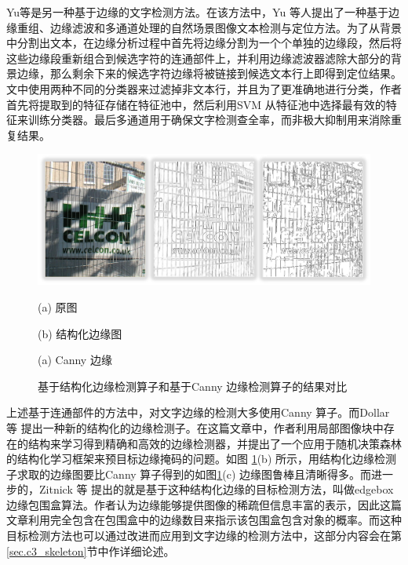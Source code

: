     Yu等\cite{Yu2016Scene}是另一种基于边缘的文字检测方法。在该方法中，Yu 等人提出了一种基于边缘重组、边缘滤波和多通道处理的自然场景图像文本检测与定位方法。为了从背景中分割出文本，在边缘分析过程中首先将边缘分割为一个个单独的边缘段，然后将这些边缘段重新组合到候选字符的连通部件上，并利用边缘滤波器滤除大部分的背景边缘，那么剩余下来的候选字符边缘将被链接到候选文本行上即得到定位结果。文中使用两种不同的分类器来过滤掉非文本行，并且为了更准确地进行分类，作者首先将提取到的特征存储在特征池中，然后利用SVM 从特征池中选择最有效的特征来训练分类器。最后多通道用于确保文字检测查全率，而非极大抑制用来消除重复结果。

    \begin{figure}[!h]
    \centering
    \includegraphics[width=\textwidth]{./figures/c2_sf_vs_canny.jpg}
    \begin{minipage}[t]{0.32\linewidth}
    \centerline{ \small (a) 原图}
    \end{minipage}
    \begin{minipage}[t]{0.32\linewidth}
    \centerline{ \small (b) 结构化边缘图}
    \end{minipage}
    \begin{minipage}[t]{0.32\linewidth}
    \centerline{ \small (a) Canny 边缘}
    \end{minipage}
    \caption{基于结构化边缘检测算子和基于Canny 边缘检测算子的结果对比}
    \label{fig.c2_sf_vs_canny}
    \end{figure}

    上述基于连通部件的方法中，对文字边缘的检测大多使用Canny 算子。而Dollar 等\cite{Dollar2015Fast} 提出一种新的结构化的边缘检测子。在这篇文章中，作者利用局部图像块中存在的结构来学习得到精确和高效的边缘检测器，并提出了一个应用于随机决策森林的结构化学习框架来预目标边缘掩码的问题。如图       \ref{fig.c2_sf_vs_canny}(b) 所示，用结构化边缘检测子求取的边缘图要比Canny 算子得到的如图\ref{fig.c2_sf_vs_canny}(c) 边缘图鲁棒且清晰得多。而进一步的，Zitnick 等\cite{Zitnick2014Edge} 提出的就是基于这种结构化边缘的目标检测方法，叫做edgebox 边缘包围盒算法。作者认为边缘能够提供图像的稀疏但信息丰富的表示，因此这篇文章利用完全包含在包围盒中的边缘数目来指示该包围盒包含对象的概率。而这种目标检测方法也可以通过改进而应用到文字边缘的检测方法中，这部分内容会在第\ref{sec.c3_skeleton}节中作详细论述。

